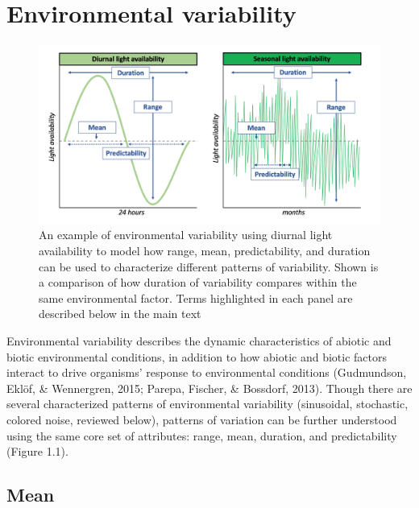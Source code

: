 \documentclass[12pt,twoside]{reedthesis}
\begin{document}
\hypertarget{environmental-variability}{%
\section{Environmental variability}\label{environmental-variability}}
\begin{figure}

{\centering \includegraphics[width=1.05\linewidth]{figures/figure1} 

}

\caption[Metrics to describe and explain environmental variability]{An example of environmental variability using diurnal light availability to model how range, mean, predictability, and duration can be used to characterize different patterns of variability. Shown is a comparison of how duration of variability compares within the same environmental factor. Terms highlighted in each panel are described below in the main text}\label{fig:unnamed-chunk-3}
\end{figure}
Environmental variability describes the dynamic characteristics of abiotic and biotic environmental conditions, in addition to how abiotic and biotic factors interact to drive organisms' response to environmental conditions (Gudmundson, Eklöf, \& Wennergren, 2015; Parepa, Fischer, \& Bossdorf, 2013). Though there are several characterized patterns of environmental variability (sinusoidal, stochastic, colored noise, reviewed below), patterns of variation can be further understood using the same core set of attributes: range, mean, duration, and predictability (Figure 1.1).

\hypertarget{mean}{%
\subsection{Mean}\label{mean}}
\end{document}
